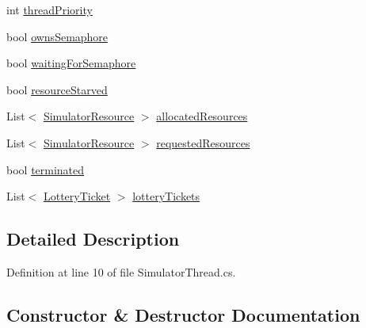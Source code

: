 \begin{DoxyCompactItemize}
\item 
int \hyperlink{class_c_p_u___o_s___simulator_1_1_operating___system_1_1_threading_1_1_simulator_thread_a4423af3d8ee2ea8ff80769ae2767ee71}{thread\+Priority}
\item 
bool \hyperlink{class_c_p_u___o_s___simulator_1_1_operating___system_1_1_threading_1_1_simulator_thread_aa6961dc4c7efb142a0028ecd1437fdb0}{owns\+Semaphore}
\item 
bool \hyperlink{class_c_p_u___o_s___simulator_1_1_operating___system_1_1_threading_1_1_simulator_thread_a61f46318084fdb50b144cb0765a18181}{waiting\+For\+Semaphore}
\item 
bool \hyperlink{class_c_p_u___o_s___simulator_1_1_operating___system_1_1_threading_1_1_simulator_thread_ae3b2878a48234d08a32e487456b4cbcc}{resource\+Starved}
\item 
List$<$ \hyperlink{class_c_p_u___o_s___simulator_1_1_operating___system_1_1_simulator_resource}{Simulator\+Resource} $>$ \hyperlink{class_c_p_u___o_s___simulator_1_1_operating___system_1_1_threading_1_1_simulator_thread_a752817365023c60589501adf61931045}{allocated\+Resources}
\item 
List$<$ \hyperlink{class_c_p_u___o_s___simulator_1_1_operating___system_1_1_simulator_resource}{Simulator\+Resource} $>$ \hyperlink{class_c_p_u___o_s___simulator_1_1_operating___system_1_1_threading_1_1_simulator_thread_a8c1f210c655ee7d76492f503e3738c94}{requested\+Resources}
\item 
bool \hyperlink{class_c_p_u___o_s___simulator_1_1_operating___system_1_1_threading_1_1_simulator_thread_a7caf8686f99333f581327e053fa437f4}{terminated}
\item 
List$<$ \hyperlink{class_c_p_u___o_s___simulator_1_1_operating___system_1_1_lottery_ticket}{Lottery\+Ticket} $>$ \hyperlink{class_c_p_u___o_s___simulator_1_1_operating___system_1_1_threading_1_1_simulator_thread_a3bd62c7c5ba611c424c4d4806835d881}{lottery\+Tickets}
\end{DoxyCompactItemize}


\subsection{Detailed Description}


Definition at line 10 of file Simulator\+Thread.\+cs.



\subsection{Constructor \& Destructor Documentation}
\hypertarget{class_c_p_u___o_s___simulator_1_1_operating___system_1_1_threading_1_1_simulator_thread_a66fbb2c9cf125ffc9bd65146ae027061}{}

